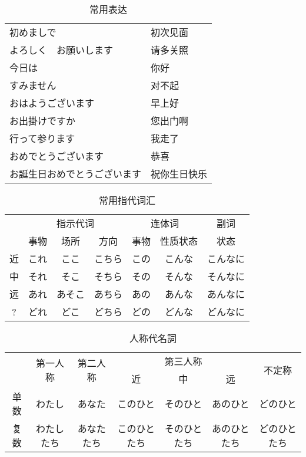 \begin{table}[h]
  \centering
  \caption{常用表达}
  \label{tab:label}
  \small
  \begin{tabular}{ll}
    初めましで & 初次见面 \\
    よろしく　お願いします & 请多关照 \\
    今日は & 你好 \\
    すみません & 对不起 \\
    おはようございます & 早上好 \\
    お出掛けですか & 您出门啊 \\
    行って参ります & 我走了 \\
    おめでとうございます & 恭喜 \\
    お誕生日おめでとうございます & 祝你生日快乐 \\
  \end{tabular}
\end{table}

\begin{table}[h]
  \centering
  \caption{常用指代词汇}
  \label{tab:label}
  \small
  \begin{tabular}{c|ccc|cc|c}
    & \multicolumn{3}{c|}{指示代词} & \multicolumn{2}{c|}{连体词} & 副词 \\
    & 事物 & 场所 & 方向 & 事物 & 性质状态 & 状态 \\
    \hline
    近 & これ & ここ   & こちら & この & こんな & こんなに \\
    中 & それ & そこ   & そちら & その & そんな & そんなに \\
    远 & あれ & あそこ & あちら & あの & あんな & あんなに \\
    ?  & どれ & どこ   & どちら & どの & どんな & どんなに \\
  \end{tabular}
\end{table}

\begin{table}[h]
  \centering
  \caption{人称代名詞}
  \label{tab:label}
  \small
  \begin{tabular}{c|c|c|ccc|c}
    & \multirow{2}{*}{第一人称} & \multirow{2}{*}{第二人称} & \multicolumn{3}{c|}{第三人称} & \multirow{2}{*}{不定称} \\
    & & & 近 & 中 & 远 & \\
    \hline
    单数 & わたし & あなた & このひと & そのひと & あのひと & どのひと \\
    复数 &わたしたち & あなたたち & このひとたち & そのひとたち & あのひとたち & どのひとたち \\
  \end{tabular}
\end{table}

